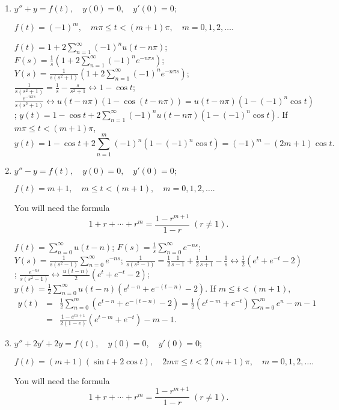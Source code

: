 \documentclass{ximera}
\begin{document}
\begin{problem}
\begin{enumerate}
\item %
$y''+y=f(t), \quad  y(0)=0,\quad  y'(0)=0$;

$f(t)=(-1)^m,\quad  m\pi\le t<(m+1)\pi,\quad m=0,1,2,\dots.$

\begin{solution}
$f(t)=1+2\sum_{n=1}^\infty(-1)^n u(t-n\pi)$; $F(s)=\frac{1}{s}\left(1+2\sum_{n=1}^\infty(-1)^n e^{-n\pi s}\right)$;
$Y(s)=\frac{1}{s(s^2+1)}\left(1+2\sum_{n=1}^\infty(-1)^n e^{-n\pi
s}\right)$;
 $\frac{1}{s(s^2+1)}=\frac{1}{s}-\frac{s}{s^2+1}
\leftrightarrow 1-\cos t$;
 $\frac{e^{-n\pi s}}{s(s^2+1)}\leftrightarrow
u(t-n\pi)(1-\cos(t-n\pi))=u(t-n\pi)(1-(-1)^n\cos t)$;
$y(t)=1-\cos t+
2\sum_{n=1}^\infty(-1)^n u(t-n\pi)(1-(-1)^n\cos t)$. If
$m\pi\le t<(m+1)\pi$,
$$
y(t)=1-\cos t+
2\sum_{n=1}^m (-1)^n(1-(-1)^n\cos t)
=(-1)^m-(2m+1)\cos t.
$$
\end{solution}

\item %
$y''-y=f(t), \quad  y(0)=0,\quad  y'(0)=0$;

$f(t)=m+1,\quad  m\le t<(m+1),\quad m=0,1,2,\dots.$

\begin{hint}
You will need the formula
$$
1+r+\cdots+r^m=\frac{1-r^{m+1}}{1-r}\; (r\ne1).
$$
\end{hint}

\begin{solution}
$f(t)=\sum_{n=0}^\infty u(t-n)$; $F(s)=\frac{1}{s}\sum_{n=0}^\infty e^{-ns}$; $Y(s)=\frac{1}{s(s^2-1)}\sum_{n=0}^\infty e^{-ns}$;
 $\frac{1}{s(s^2-1)}=\frac{1}{2}\frac{1}{s-1}+\frac{1}{2}\frac{1}{s+1}-\frac{1}{s}
\leftrightarrow \frac{1}{2}(e^t+e^{-t}-2)$;
 $\frac{e^{-ns}}{s(s^2-1)}\leftrightarrow
\frac{u(t-n)}{2}\left(e^t+e^{-t}-2\right)$;
$y(t)=\frac{1}{2}
\sum_{n=0}^\infty u(t-n)\left(e^{t-n}+e^{-(t-n)}-2\right)$. If $m\le
t<(m+1)$,
\begin{eqnarray*}
y(t)&=&\frac{1}{2}
\sum_{n=0}^m\left(e^{t-n}+e^{-(t-n)}-2\right)=
\frac{1}{2}(e^{t-m}+e^{-t})\sum_{n=0}^me^n-m-1\\
&=&\frac{1-e^{m+1}}{2(1-e)}(e^{t-m}+e^{-t})-m-1.
\end{eqnarray*}
\end{solution}

\item %
$y''+2y'+2y=f(t), \quad  y(0)=0,\quad  y'(0)=0$;

$f(t)=(m+1)(\sin t+2\cos t),\quad  2m\pi\le t<2(m+1)\pi,\quad
m=0,1,2,\dots.$

\begin{hint}
You will need the formula
$$
1+r+\cdots+r^m=\frac{1-r^{m+1}}{1-r}\; (r\ne1).
$$
\end{hint}


\end{enumerate}
\end{problem}
\end{document}
